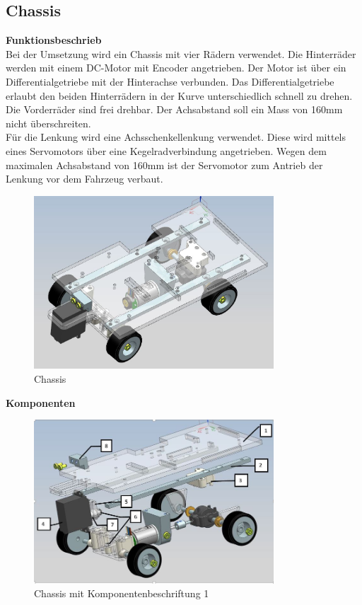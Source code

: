 \newpage
\subsection{Chassis}
\textbf{Funktionsbeschrieb}\\[0.2cm]
Bei der Umsetzung wird ein Chassis mit vier Rädern verwendet. Die Hinterräder werden mit einem DC-Motor mit Encoder angetrieben. Der Motor ist über ein Differentialgetriebe mit der Hinterachse verbunden. Das Differentialgetriebe erlaubt den beiden Hinterrädern in der Kurve unterschiedlich schnell zu drehen. Die Vorderräder sind frei drehbar. Der Achsabstand soll ein Mass von 160mm nicht überschreiten.\\
Für die Lenkung wird eine Achsschenkellenkung verwendet. Diese wird mittels eines Servomotors über eine Kegelradverbindung angetrieben. Wegen dem maximalen Achsabstand von 160mm ist der Servomotor zum Antrieb der Lenkung vor dem Fahrzeug verbaut.
\begin{figure}[H]%
\centering
\includegraphics[width=0.8\textwidth]{03_Loesungskonzept/pictures2/Chassis.JPG}
\caption{Chassis}
\label{fig:activityRoute}
\end{figure}
\newpage
\textbf{Komponenten}\\[0.2cm]
\begin{figure}[H]%
\centering
\includegraphics[width=0.8\textwidth]{03_Loesungskonzept/pictures2/Explosion_Chassis_1_lg.JPG}
\caption{Chassis mit Komponentenbeschriftung 1}
\label{fig:activityRoute}
\end{figure}
